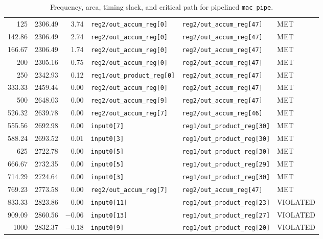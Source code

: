 \documentclass[a4paper,11pt]{article}
\begin{document}
\begin{table}[htbp]
\begin{tabular}{r r r l l l}
        125     & 2306.49 & 3.74   & \texttt{reg2/out\_accum\_reg[0]}  & \texttt{reg2/out\_accum\_reg[47]} & MET \\
        142.86  & 2306.49 & 2.74   & \texttt{reg2/out\_accum\_reg[0]}  & \texttt{reg2/out\_accum\_reg[47]} & MET \\
        166.67  & 2306.49 & 1.74   & \texttt{reg2/out\_accum\_reg[0]}  & \texttt{reg2/out\_accum\_reg[47]} & MET \\
        200     & 2305.16 & 0.75   & \texttt{reg2/out\_accum\_reg[0]}  & \texttt{reg2/out\_accum\_reg[47]} & MET \\
        250     & 2342.93 & 0.12   & \texttt{reg1/out\_product\_reg[0]} & \texttt{reg2/out\_accum\_reg[47]} & MET \\
        333.33  & 2459.44 & 0.00   & \texttt{reg2/out\_accum\_reg[0]}  & \texttt{reg2/out\_accum\_reg[47]} & MET \\
        500     & 2648.03 & 0.00   & \texttt{reg2/out\_accum\_reg[9]}  & \texttt{reg2/out\_accum\_reg[47]} & MET \\
        526.32  & 2639.78 & 0.00   & \texttt{reg2/out\_accum\_reg[7]}  & \texttt{reg2/out\_accum\_reg[46]} & MET \\
        555.56  & 2692.98 & 0.00   & \texttt{input0[7]}  & \texttt{reg1/out\_product\_reg[30]} & MET \\
        588.24  & 2693.52 & 0.01   & \texttt{input0[3]}  & \texttt{reg1/out\_product\_reg[30]} & MET \\
        625     & 2722.78 & 0.00   & \texttt{input0[5]}  & \texttt{reg1/out\_product\_reg[30]} & MET \\
        666.67  & 2732.35 & 0.00   & \texttt{input0[5]}  & \texttt{reg1/out\_product\_reg[29]} & MET \\
        714.29  & 2724.64 & 0.00   & \texttt{input0[3]}  & \texttt{reg1/out\_product\_reg[30]} & MET \\
        769.23  & 2773.58 & 0.00   & \texttt{reg2/out\_accum\_reg[7]}  & \texttt{reg2/out\_accum\_reg[47]} & MET \\
        833.33  & 2823.86 & 0.00   & \texttt{input0[11]} & \texttt{reg1/out\_product\_reg[23]} & VIOLATED \\
        909.09  & 2860.56 & $-0.06$ & \texttt{input0[13]} & \texttt{reg1/out\_product\_reg[27]} & VIOLATED \\
        1000    & 2832.37 & $-0.18$ & \texttt{input0[9]}  & \texttt{reg1/out\_product\_reg[20]} & VIOLATED \\
        \bottomrule
    \end{tabular}
    \caption{Frequency, area, timing slack, and critical path for pipelined \texttt{mac\_pipe}.}
    \label{tab:pipe-frequency-area-slack-path}
\end{table}
\end{document}
